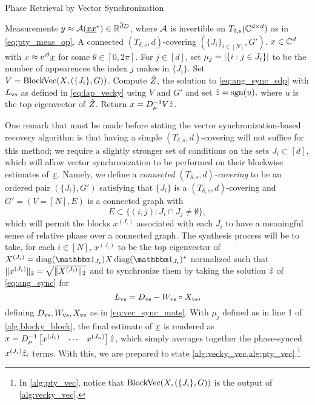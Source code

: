\begin{algorithm}
\renewcommand{\algorithmicrequire}{\textbf{Input:}}
\renewcommand{\algorithmicensure}{\textbf{Output:}}
\caption{Phase Retrieval by Vector Synchronization}
\label{alg:pty_vec}
\begin{algorithmic}[1]
  \REQUIRE Measurements $y \approx \mathcal{A}(\underline{x} \underline{x}^*) \in \mathbb{R}^{\overline{d} D}$, where $\mathcal{A}$ is invertible on $T_{\delta, s}(\mathbb{C}^{d \times d})$ as in \eqref{eq:pty_meas_op}.  A connected $(T_{\delta, s}, d)$-covering $(\{J_i\}_{i \in [N]}, G')$.
  \ENSURE $x \in \mathbb{C}^d$ with $x \approx \mathrm{e}^{\mathrm{i} \theta} \underline{x}$ for some $\theta \in [0, 2 \pi]$.
  \STATE For $j \in [d]$, set $\mu_j = \lvert\{i : j \in J_i\}\rvert$ to be the number of appearences the index $j$ makes in $\{J_i\}$.
  \STATE Set $V = \operatorname{BlockVec}(X, (\{J_i\}, G))$.
  \STATE Compute $\hat{Z}$, the solution to \eqref{eq:ang_sync_sdp} with $L_{\rm vs}$ as defined in \eqref{eq:lap_vecky} using $V$ and $G'$ and set $\hat{z} = \operatorname{sgn}(u),$ where $u$ is the top eigenvector of $\hat{Z}$.
  \STATE Return $x = D_\mu^{-1} V \hat{z}$.
\end{algorithmic}
\end{algorithm}

One remark that must be made before stating the vector synchronization-based recovery algorithm is that having a simple $(T_{\delta, s}, d)$-covering will not suffice for this method; we require a slightly stronger set of conditions on the sets $J_i \subset [d]$, which will allow vector synchronization to be performed on their blockwise estimates of $\underline{x}$.  Namely, we define a \emph{connected $(T_{\delta, s}, d)$-covering} to be an ordered pair $(\{J_i\}, G')$ satisfying that $\{J_i\}$ is a $(T_{\delta, s}, d)$-covering and $G' = (V = [N], E)$ is a connected graph with \[E \subset \{(i, j) : J_i \cap J_j \neq \emptyset\},\] %
which will permit the blocks $x^{(J_i)}$ associated with each $J_i$ to have a meaningful sense of relative phase over a connected graph.  The synthesis process will be to take, for each $i \in [N]$, $x^{(J_i)}$ to be the top eigenvector of $X^{(J_i)} = \diag(\one_{J_i}) X \diag(\one_{J_i})^*$ normalized such that $\lVert x^{(J_i)}\rVert_2 = \sqrt{\lVert X^{(J_i)}\rVert_2}$ and to synchronize them by taking the solution $\hat{z}$ of \eqref{eq:ang_sync} for \begin{equation} L_{\rm vs} = D_{\rm vs} - W_{\rm vs} \circ X_{\rm vs}, \label{eq:lap_vecky} \end{equation} defining $D_{\rm vs}, W_{\rm vs}, X_{\rm vs}$ as in \eqref{eq:vec_sync_mats}.  With $\mu_j$ defined as in line 1 of \cref{alg:blocky_block}, the final estimate of $\underline{x}$ is rendered as $x = D_\mu^{-1} \begin{bmatrix} x^{(J_1)} & \cdots & x^{(J_n)} \end{bmatrix} \hat{z}$, which simply averages together the phase-synced $x^{(J_i)} \hat{z}_i$ terms.  With this, we are prepared to state \cref{alg:vecky_vec,alg:pty_vec}.\footnote{In \cref{alg:pty_vec}, notice that $\operatorname{BlockVec}(X, (\{J_i\}, G))$ is the output of \cref{alg:vecky_vec}.}

